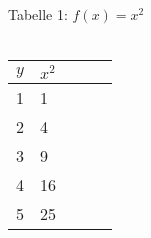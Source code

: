 \documentclass[a4paper,12pt]{article}
\begin{document}
\noindent Tabelle 1: $f\left(x\right) = x^2$\\\\
\begin{tabular}{ lllll }
	$y$ & $x^2$\\
	\hline
	 1 & 1 \\
	 2 & 4 \\
	 3 & 9 \\
	 4 & 16 \\
	 5 & 25
\end{tabular}
\end{document}
